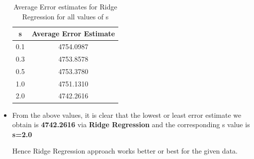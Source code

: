 \documentclass[11pt]{article}
\begin{document}
\begin{itemize}
	\begin{table}[h]
		\centering
		\begin{tabular}{|c|c|}
			\hline
			\textbf{s}  & \textbf{Average Error Estimate}\\
			\hline
			0.1 &  4754.0987  \\
			\hline
			0.3&  4753.8578 \\
			\hline
			0.5 &  4753.3780 \\
			\hline
		    1.0 & 4751.1310 \\
		    \hline
		    2.0 &  4742.2616 \\
		    \hline	
		\end{tabular}
		\caption{Average Error estimates for Ridge Regression for all values of s}
		\label{t2}
	\end{table}
	
	\item[] From the above values, it is clear that the lowest or least error estimate we obtain is \textbf{4742.2616} via \textbf{Ridge Regression} and the corresponding s value is \textbf{s=2.0}
	
	Hence Ridge Regression approach works better or best for the given data.
	
	
\end{itemize}
\end{document}
